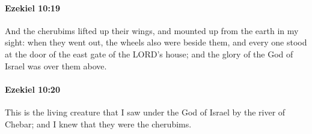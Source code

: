 		\paragraph{Ezekiel 10:19} %
			\label{EZEKIEL-10-19}

			And the cherubims lifted up their wings, and mounted up from the earth in my sight: when they went out, the wheels also were beside them, and every one stood at the door of the east gate of the LORD’s house; and the glory of the God of Israel was over them above.


		\paragraph{Ezekiel 10:20} %
			\label{EZEKIEL-10-20}

			This is the living creature that I saw under the God of Israel by the river of Chebar; and I knew that they were the cherubims.

